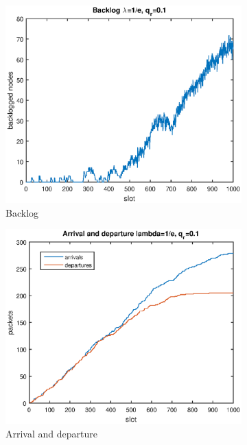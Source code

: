 \documentclass{article}
\begin{document}
\begin{figure}[h]
  \begin{subfigure}{.5\textwidth}
    \includegraphics[width=\textwidth]{figures/backlog3.eps}
    \caption{Backlog}
    \label{fig:backlog3}
  \end{subfigure}%
  \begin{subfigure}{.5\textwidth}
    \includegraphics[width=\textwidth]{figures/arrival-departure-3.eps}
    \caption{Arrival and departure}
    \label{fig:arrival-departure-3}
  \end{subfigure}
  \caption{}
\end{figure}
\end{document}
